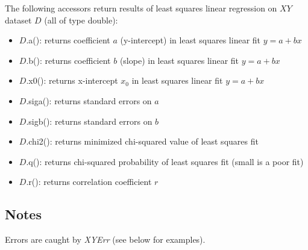\documentclass{report}
\begin{document}
The following accessors return results of least squares linear
regression on $XY$ dataset $D$ (all of type double):
\begin{itemize}
\item $D$.a(): returns coefficient $a$ (y-intercept) in least squares
linear fit $y = a + bx$
\item $D$.b(): returns coefficient $b$ (slope) in least squares linear
fit $y = a + bx$
\item $D$.x0(): returns x-intercept $x_0$ in least squares linear fit
$y = a + bx$
\item $D$.siga(): returns standard errors on $a$
\item $D$.sigb(): returns standard errors on $b$
\item $D$.chi2(): returns minimized chi-squared value of least squares
fit
\item $D$.q(): returns chi-squared probability of least squares fit
(small is a poor fit)
\item $D$.r(): returns correlation coefficient $r$
\end{itemize}

\subsection{Notes}
Errors are caught by {\em XYErr} (see below for examples).
\end{document}
